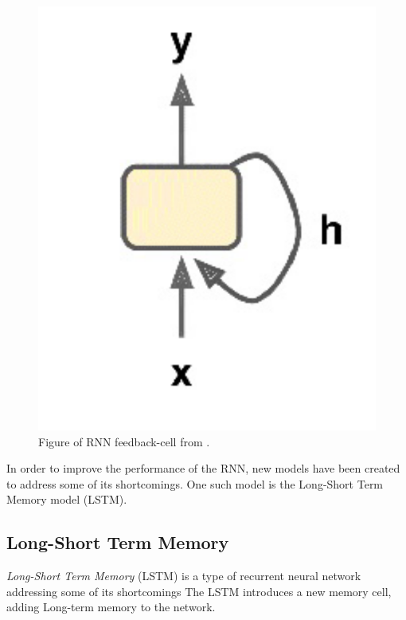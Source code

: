 \begin{figure}[h!]
    \centering
    \includegraphics[width=\textwidth]{./sections/BT/figures/RNN_neuron_hands_on.png}
    \hfill
    \caption{Figure of RNN feedback-cell from \cite[p.~472]{Geron2017}.}
    \label{fig:rnn-cell}
\end{figure}



In order to improve the performance of the RNN, new models have been created to address some of its shortcomings.
One such model is the Long-Short Term Memory model (LSTM).


\cite[p.~469-472]{Geron2017}

\subsection{Long-Short Term Memory}

\textit{Long-Short Term Memory} (LSTM) is a type of recurrent neural network addressing some of its shortcomings
The LSTM introduces a new memory cell, adding Long-term memory to the network.


